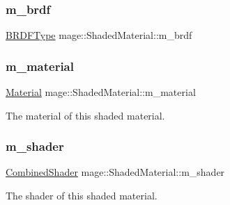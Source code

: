 \hypertarget{structmage_1_1_shaded_material_a59a4b0ecb6ab1d60a285e0f1f69b5e36}{}\label{structmage_1_1_shaded_material_a59a4b0ecb6ab1d60a285e0f1f69b5e36} 
\subsubsection{\texorpdfstring{m\+\_\+brdf}{m\_brdf}}
{\footnotesize\ttfamily \hyperlink{namespacemage_ae7a7a03a7b34d7e2689689bb8295cd38}{B\+R\+D\+F\+Type} mage\+::\+Shaded\+Material\+::m\+\_\+brdf\hspace{0.3cm}{\ttfamily [private]}}

\hypertarget{structmage_1_1_shaded_material_a319e1ca2103c50f84ce0605b08bd34b4}{}\label{structmage_1_1_shaded_material_a319e1ca2103c50f84ce0605b08bd34b4} 
\subsubsection{\texorpdfstring{m\+\_\+material}{m\_material}}
{\footnotesize\ttfamily \hyperlink{structmage_1_1_material}{Material} mage\+::\+Shaded\+Material\+::m\+\_\+material\hspace{0.3cm}{\ttfamily [private]}}

The material of this shaded material. \hypertarget{structmage_1_1_shaded_material_a712d07ac1995ff592bbb8ab20a294270}{}\label{structmage_1_1_shaded_material_a712d07ac1995ff592bbb8ab20a294270} 
\subsubsection{\texorpdfstring{m\+\_\+shader}{m\_shader}}
{\footnotesize\ttfamily \hyperlink{structmage_1_1_combined_shader}{Combined\+Shader} mage\+::\+Shaded\+Material\+::m\+\_\+shader\hspace{0.3cm}{\ttfamily [private]}}

The shader of this shaded material. 